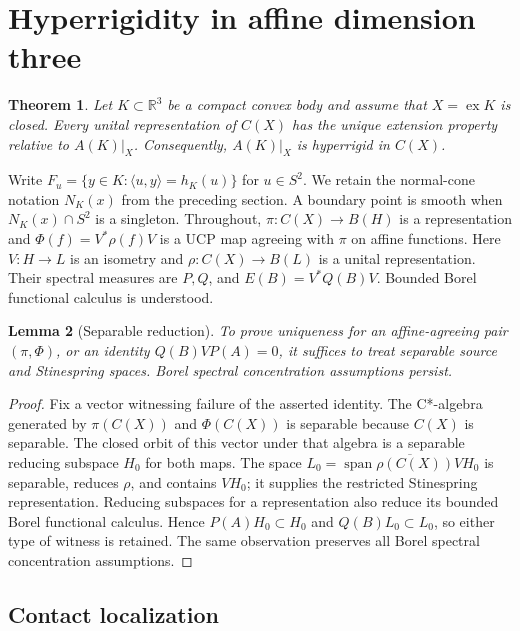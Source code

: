 \documentclass[11pt,letterpaper]{amsart}
\newtheorem{theorem}{Theorem}[section]
\newtheorem{lemma}[theorem]{Lemma}
\theoremstyle{definition}
\theoremstyle{remark}
\numberwithin{equation}{section}
\DeclareMathOperator{\ex}{ex}
\begin{document}
\section{Hyperrigidity in affine dimension three}
\label{sec:dimension-three}

\begin{theorem}\label{thm:three}
Let $K\subset\mathbb R^3$ be a compact convex body and assume that
$X=\ex K$ is closed. Every unital representation of $C(X)$ has the
unique extension property relative to $A(K)|_X$. Consequently,
$A(K)|_X$ is hyperrigid in $C(X)$.
\end{theorem}

Write $F_u=\{y\in K:\langle u,y\rangle=h_K(u)\}$ for $u\in S^2$.
We retain the normal-cone notation $N_K(x)$ from the preceding section.
A boundary point is smooth when $N_K(x)\cap S^2$ is a singleton.
Throughout, $\pi:C(X)\to B(H)$ is a representation and
$\Phi(f)=V^*\rho(f)V$ is a UCP map agreeing with $\pi$ on affine
functions. Here $V:H\to L$ is an isometry and $\rho:C(X)\to B(L)$ is a
unital representation. Their spectral measures are $P,Q$, and
$E(B)=V^*Q(B)V$. Bounded Borel functional calculus is understood.

\begin{lemma}[Separable reduction]\label{lem:separable}
To prove uniqueness for an affine-agreeing pair $(\pi,\Phi)$, or an
identity $Q(B)VP(A)=0$, it suffices to treat separable source and
Stinespring spaces. Borel spectral concentration assumptions persist.
\end{lemma}
\begin{proof}
Fix a vector witnessing failure of the asserted identity. The C*-algebra
generated by $\pi(C(X))$ and $\Phi(C(X))$ is separable because $C(X)$
is separable. The closed orbit of this vector under that algebra is a
separable reducing subspace $H_0$ for both maps. The space
$L_0=\overline{\operatorname{span}\rho(C(X))VH_0}$ is separable, reduces $\rho$, and
contains $VH_0$; it supplies the restricted Stinespring representation.
Reducing subspaces for a representation also reduce its bounded Borel
functional calculus. Hence $P(A)H_0\subset H_0$ and $Q(B)L_0\subset L_0$,
so either type of witness is retained. The same observation preserves
all Borel spectral concentration assumptions.
\end{proof}

\subsection{Contact localization}
\end{document}
